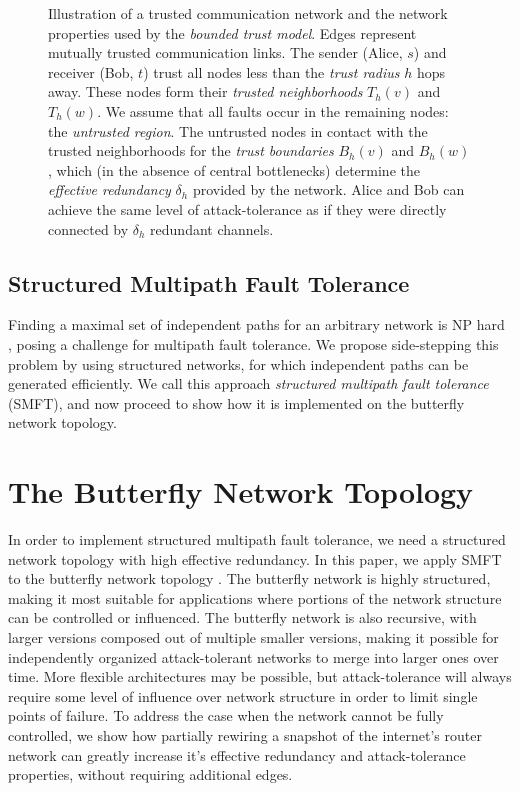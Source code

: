 \documentclass[10pt,letterpaper]{article}
\begin{document}
\begin{figure}
\caption{
Illustration of a trusted communication network and the network properties
used by the {\em bounded trust model}.
Edges represent mutually trusted communication links.
The sender (Alice, $s$) and receiver (Bob, $t$) trust all nodes
less than the {\em trust radius} $h$ hops away.
These nodes form their {\em trusted neighborhoods} $T_h(v)$ and $T_h(w)$.
We assume that all faults occur in the remaining nodes: the
{\em untrusted region}.
The untrusted nodes in contact with the trusted neighborhoods for the
{\em trust boundaries} $B_h(v)$ and $B_h(w)$,
which (in the absence of central bottlenecks) determine the
{\em effective redundancy} $\delta_h$ provided by the network.
Alice and Bob can achieve the same level of attack-tolerance
as if they were directly connected by $\delta_h$ redundant channels.
}
\label{fig:trust-source}
\end{figure}

\subsection*{Structured Multipath Fault Tolerance}

Finding a maximal set of independent paths for an arbitrary network is NP hard
\cite{reiter_resilient_1998},
posing a challenge for multipath fault tolerance.
We propose side-stepping this problem by using structured networks,
for which independent paths can be generated efficiently.
We call this approach {\em structured multipath fault tolerance} (SMFT),
and now proceed to show how it is implemented on the butterfly
network topology.

\section*{The Butterfly Network Topology}
\label{sec-butterfly}

In order to implement structured multipath fault tolerance,
we need a structured network topology with high effective redundancy.
In this paper, we apply SMFT to the butterfly network topology
\cite{kshemkalyani_distributed_2008}.
The butterfly network is highly structured,
making it most suitable for applications where portions of the network structure
can be controlled or influenced.
The butterfly network is also recursive, with larger versions composed out of
multiple smaller versions,
making it possible for independently organized
attack-tolerant networks to merge into larger ones over time.
More flexible architectures may be possible,
but attack-tolerance will always require some level of influence over
network structure in order to limit single points of failure.
To address the case when the network cannot be fully controlled,
we show how partially rewiring a snapshot of the internet's router
network can greatly increase it's effective redundancy and
attack-tolerance properties, without requiring additional edges.
\end{document}
